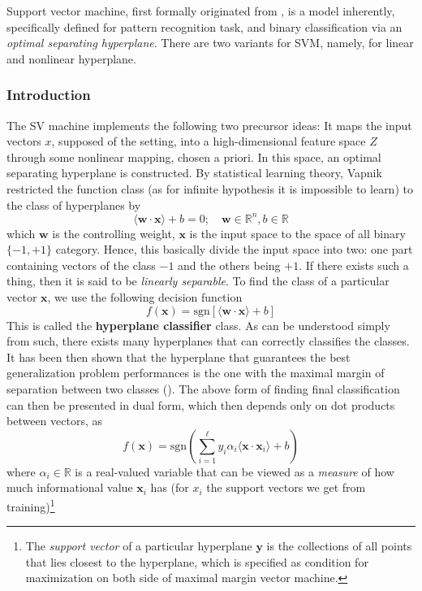 Support vector machine, first formally originated from \cite{Vapnik1999-VAPTNO}, is a model inherently, specifically defined for pattern recognition task, and binary classification via an \textit{optimal separating hyperplane}. There are two variants for SVM, namely, for linear and nonlinear hyperplane. 

\subsubsection{Introduction}

The SV machine implements the following two precursor ideas: It maps the input vectors $x$, supposed of the setting, into a high-dimensional feature space $Z$ through some nonlinear mapping, chosen a priori. In this space, an optimal separating hyperplane is constructed. By statistical learning theory, Vapnik restricted the function class (as for infinite hypothesis it is impossible to learn) to the class of hyperplanes by 
\begin{equation}
    \langle \mathbf{w}\cdot \mathbf{x} \rangle + b = 0 ; \quad \mathbf{w}\in \mathbb{R}^{n} , b\in \mathbb{R}
\end{equation}
which $\mathbf{w}$ is the controlling weight, $\mathbf{x}$ is the input space to the space of all binary $\{-1,+1\}$ category. Hence, this basically divide the input space into two: one part containing vectors of the class $-1$ and the others being $+1$. If there exists such a thing, then it is said to be \textit{linearly separable}. To find the class of a particular vector $\mathbf{x}$, we use the following decision function 
\begin{equation}
    f(\mathbf{x}) = \mathrm{sgn}[\langle \mathbf{w}\cdot \mathbf{x}\rangle+ b]
\end{equation}
This is called the \textbf{hyperplane classifier} class. As can be understood simply from such, there exists many hyperplanes that can correctly classifies the classes. It has been then shown that the hyperplane that guarantees the best generalization problem performances is the one with the maximal margin of separation between two classes (\cite{Cristianini2000AnIT}). The above form of finding final classification can then be presented in dual form, which then depends only on dot products between vectors, as 
\begin{equation}
    f(\mathbf{x}) = \mathrm{sgn}\left(\sum^{\ell}_{i=1} y_{i}\alpha_{i} \langle \mathbf{x}\cdot \mathbf{x}_{i} \rangle+ b\right)
\end{equation} where $\alpha_{i}\in \mathbb{R}$ is a real-valued variable that can be viewed as a \textit{measure} of how much informational value $\mathbf{x}_{i}$ has (for $x_{i}$ the support vectors we get from training)\footnote{The \textit{support vector} of a particular hyperplane $\mathbf{y}$ is the collections of all points that lies closest to the hyperplane, which is specified as condition for maximization on both side of maximal margin vector machine.}

